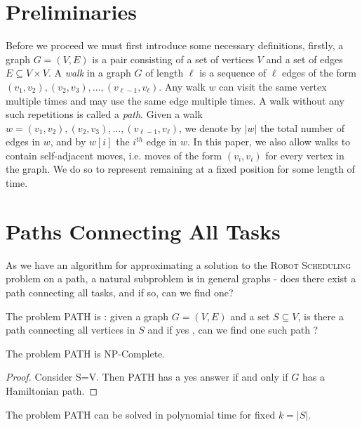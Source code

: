 \documentclass{DAC}
\begin{document}
\section{Preliminaries}\label{sec:prelim}
Before we proceed we must first introduce some necessary definitions, firstly,  a graph $G=(V,E)$ is a pair consisting of a set of vertices $V$ and a set of edges $E \subseteq V \times V$. A \emph{walk} in a graph $G$ of length $\ell$ is a sequence of $\ell$ edges of the form $(v_1, v_2), (v_2, v_3), \dots, (v_{\ell - 1}, v_{\ell})$. Any walk $w$ can visit the same vertex multiple times and may use the same edge multiple times. 
A walk without any such repetitions is called a \emph{path}. 
Given a walk $w = (v_1, v_2), (v_2, v_3), \dots, (v_{\ell - 1}, v_{\ell})$, we denote by $\vert w \vert$ the total number of edges in $w$, and by $w[i]$ the $i^{th}$ edge in $w$. In this paper, we also allow walks to contain self-adjacent moves, i.e. moves of the form $(v_i, v_i)$ for every vertex in the graph. We do so to represent remaining at a fixed position for some length of time.

\section{Paths Connecting All Tasks} \label{sec:path_connecting_tasks_hardness}
As we have an algorithm for approximating a solution to the \textsc{Robot Scheduling} problem on a path, a natural subproblem is in general graphs - does there exist a path connecting all tasks, and if so, can we find one?

The problem PATH is : given a graph $G=(V,E)$ and a set $S \subseteq V$, is there a path connecting all vertices in $S$ and if yes , can we find one such path ?

\begin{theorem}\label{thm:path_NPC}
The problem PATH is NP-Complete.
\end{theorem}

\begin{proof}
Consider S=V. Then PATH has a yes answer if and only if $G$ has a Hamiltonian path.   
\end{proof}


\begin{theorem}\label{thm:path_polytime}
    The problem PATH can be solved in polynomial time for fixed $k = \vert S \vert$. %
\end{theorem}
\end{document}
